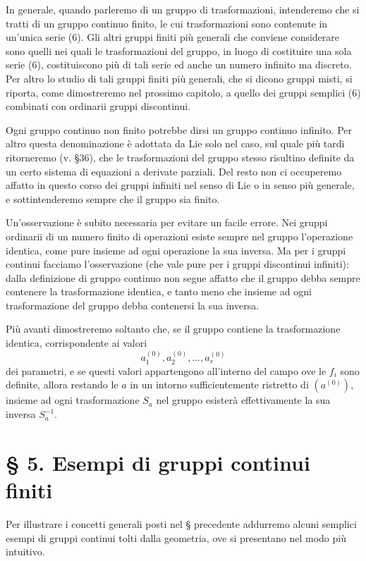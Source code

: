 \documentclass[11pt]{book}
\begin{document}
In generale, quando parleremo di un gruppo di trasformazioni, intenderemo che si tratti di un gruppo continuo finito, le cui trasformazioni sono contenute in un'unica serie (6). Gli altri gruppi finiti più generali che conviene considerare sono quelli nei quali le trasformazioni del gruppo, in luogo di costituire una sola serie (6), costituiscono più di tali serie ed anche un numero infinito ma discreto. Per altro lo studio di tali gruppi finiti più generali, che si dicono gruppi misti, si riporta, come dimostreremo nel prossimo capitolo, a quello dei gruppi semplici (6) combinati con ordinarii gruppi discontinui.

Ogni gruppo continuo non finito potrebbe dirsi un gruppo continuo infinito. Per altro questa denominazione è adottata da Lie solo nel caso, sul quale più tardi ritorneremo (v. \S{}36), che le trasformazioni del gruppo stesso risultino definite da un certo sistema di equazioni a derivate parziali. Del resto non ci occuperemo affatto in questo corso dei gruppi infiniti nel senso di Lie o in senso più generale, e sottintenderemo sempre che il gruppo sia finito.

Un'osservazione è subito necessaria per evitare un facile errore. Nei gruppi ordinarii di un numero finito di operazioni esiste sempre nel gruppo l'operazione identica, come pure insieme ad ogni operazione la sua inversa. Ma per i gruppi continui facciamo l'osservazione (che vale pure per i gruppi discontinui infiniti): dalla definizione di gruppo continuo non segue affatto che il gruppo debba sempre contenere la trasformazione identica, e tanto meno che insieme ad ogni trasformazione del gruppo debba contenersi la sua inversa.

Più avanti dimostreremo soltanto che, se il gruppo contiene la trasformazione identica, corrispondente ai valori
\[
 a_1^{(0)},a_2^{(0)},\ldots,a_r^{(0)}
\]
dei parametri, e se questi valori appartengono all'interno del campo ove le $f_i$ sono definite, allora restando le $a$ in un intorno sufficientemente ristretto di $(a^{(0)})$, insieme ad ogni trasformazione $S_a$ nel gruppo esisterà effettivamente la sua inversa $S_a^{-1}$.

\section*{\S{} 5. Esempi di gruppi continui finiti}

Per illustrare i concetti generali posti nel \S{} precedente addurremo alcuni semplici esempi di gruppi continui tolti dalla geometria, ove si presentano nel modo più intuitivo.
\end{document}
